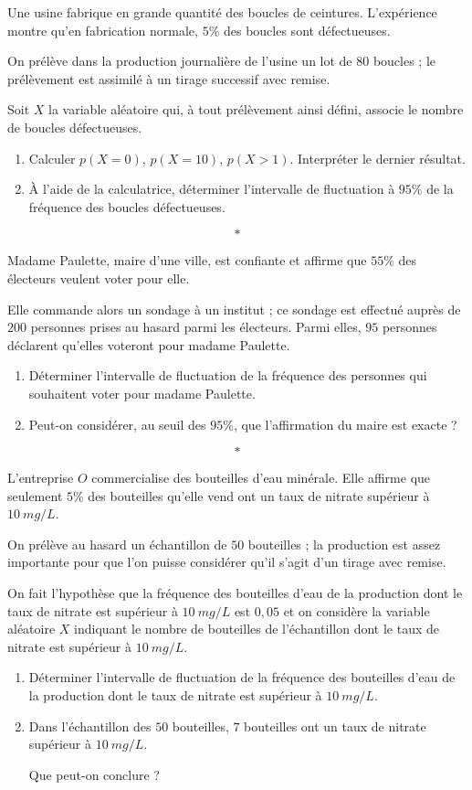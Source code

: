 \documentclass[12pt,openright,twoside,french]{book}
\begin{document}
\bigskip

\exo Une usine fabrique en grande quantité des boucles de ceintures. L'expérience montre qu'en fabrication normale, $5\%$ des boucles sont défectueuses.\par
On prélève dans la production journalière de l'usine un lot de $80$ boucles ; le prélèvement est assimilé à un tirage successif avec remise.\par
Soit $X$ la variable aléatoire qui, à tout prélèvement ainsi défini, associe le nombre de boucles défectueuses.

\begin{enumerate}
    \item Calculer $p(X = 0)$, $p(X = 10)$, $p(X > 1)$. Interpréter le dernier résultat.
    \item À l'aide de la calculatrice, déterminer l'intervalle de fluctuation à $95\%$ de la fréquence des boucles défectueuses.
\end{enumerate}\[*\]

\exo Madame Paulette, maire d'une ville, est confiante et affirme que $55\%$ des électeurs veulent voter pour elle.\par
Elle commande alors un sondage à un institut ; ce sondage est effectué auprès de $200$ personnes prises au hasard parmi les électeurs. Parmi elles, $95$ personnes déclarent qu'elles voteront pour madame Paulette.
\begin{enumerate}
    \item Déterminer l'intervalle de fluctuation de la fréquence des personnes qui souhaitent voter pour madame Paulette.
    \item Peut-on considérer, au seuil des $95\%$, que l'affirmation du maire est exacte ?
\end{enumerate}\[*\]

\exo L'entreprise $O$ commercialise des bouteilles d'eau minérale. Elle affirme que seulement $5\%$ des bouteilles qu'elle vend ont un taux de nitrate supérieur à $10~mg/L$.\par
On prélève au hasard un échantillon de $50$ bouteilles ; la production est assez importante pour que l'on puisse considérer qu'il s'agit d'un tirage avec remise.\par
On fait l'hypothèse que la fréquence des bouteilles d'eau de la production dont le taux de nitrate est supérieur à $10~mg/L$ est $0,05$ et on considère la variable aléatoire $X$ indiquant le nombre de bouteilles de l'échantillon dont le taux de nitrate est supérieur à $10~mg/L$.

\begin{enumerate}
    \item Déterminer l'intervalle de fluctuation de la fréquence des bouteilles d'eau de la production dont le taux de nitrate est supérieur à $10~mg/L$.
    \item Dans l'échantillon des $50$ bouteilles, $7$ bouteilles ont un taux de nitrate supérieur à $10~mg/L$.\par
    Que peut-on conclure ?
\end{enumerate}
\end{document}

